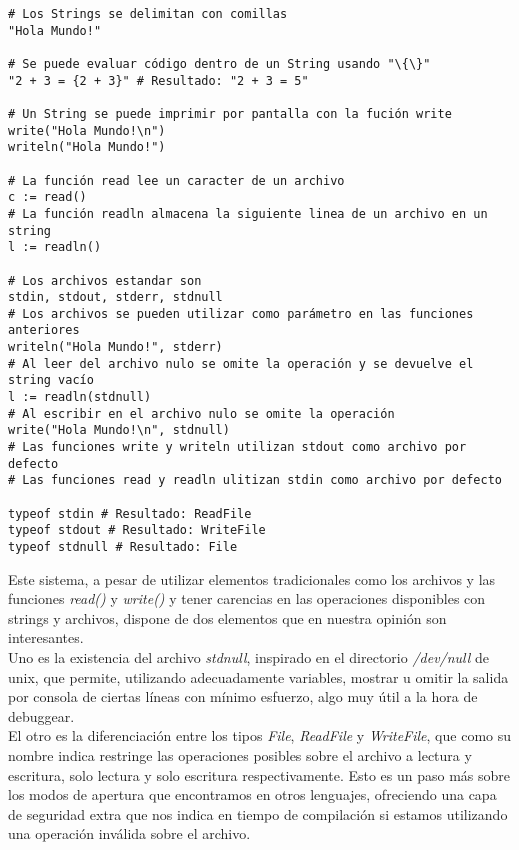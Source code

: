 \begin{lstlisting}[style=tail, caption={Strings y Entrada/Salida}]
# Los Strings se delimitan con comillas
"Hola Mundo!"

# Se puede evaluar código dentro de un String usando "\{\}"
"2 + 3 = {2 + 3}" # Resultado: "2 + 3 = 5"

# Un String se puede imprimir por pantalla con la fución write
write("Hola Mundo!\n")
writeln("Hola Mundo!")

# La función read lee un caracter de un archivo
c := read()
# La función readln almacena la siguiente linea de un archivo en un string
l := readln()

# Los archivos estandar son
stdin, stdout, stderr, stdnull
# Los archivos se pueden utilizar como parámetro en las funciones anteriores
writeln("Hola Mundo!", stderr)
# Al leer del archivo nulo se omite la operación y se devuelve el string vacío
l := readln(stdnull)
# Al escribir en el archivo nulo se omite la operación
write("Hola Mundo!\n", stdnull)
# Las funciones write y writeln utilizan stdout como archivo por defecto
# Las funciones read y readln ulitizan stdin como archivo por defecto

typeof stdin # Resultado: ReadFile
typeof stdout # Resultado: WriteFile
typeof stdnull # Resultado: File
\end{lstlisting}

Este sistema, a pesar de utilizar elementos tradicionales como los archivos y las funciones \textit{read()} y \textit{write()} y tener carencias en las operaciones disponibles con strings y archivos, dispone de dos elementos que en nuestra opinión son interesantes.\\

Uno es la existencia del archivo \textit{stdnull}, inspirado en el directorio \mbox{\textit{/dev/null}} de unix, que permite, utilizando adecuadamente variables, mostrar u omitir la salida por consola de ciertas líneas con mínimo esfuerzo, algo muy útil a la hora de debuggear.\\

El otro es la diferenciación entre los tipos \textit{File}, \textit{ReadFile} y \textit{WriteFile}, que como su nombre indica restringe las operaciones posibles sobre el archivo a lectura y escritura, solo lectura y solo escritura respectivamente. Esto es un paso más sobre los modos de apertura que encontramos en otros lenguajes, ofreciendo una capa de seguridad extra que nos indica en tiempo de compilación si estamos utilizando una operación inválida sobre el archivo.


